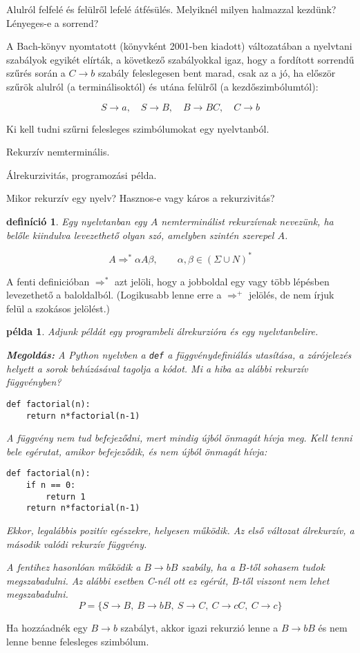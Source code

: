 \documentclass[a4paper]{article}
\newtheorem{pelda}{példa}[section]
\newtheorem{definicio}{definíció}[section]
\begin{document}
Alulról felfelé és felülről lefelé átfésülés.
Melyiknél milyen halmazzal kezdünk? Lényeges-e a sorrend?

A Bach-könyv nyomtatott (könyvként 2001-ben kiadott) változatában a nyelvtani
szabályok egyikét elírták, a következő szabályokkal igaz, hogy a
fordított sorrendű szűrés során a $C\to b$ szabály feleslegesen
bent marad, csak az a jó, ha először szűrök alulról (a terminálisoktól)
és utána felülről (a kezdőszimbólumtól):

\[S\to a,\quad S\to B,\quad B\to BC,\quad C\to b\]

Ki kell tudni szűrni felesleges szimbólumokat egy nyelvtanból.

Rekurzív nemterminális.

Álrekurzivitás, programozási példa.

Mikor rekurzív egy nyelv? Hasznos-e vagy káros a rekurzivitás?

\vspace{2em}

\begin{definicio}
    Egy nyelvtanban egy $A$ nemterminálist rekurzívnak nevezünk, ha belőle
    kiindulva levezethető olyan szó, amelyben szintén szerepel $A$.

    \[A \Rightarrow^* \alpha A \beta,
    \qquad \alpha, \beta \in (\Sigma \cup N)^*\]
\end{definicio}

A fenti definicióban $\Rightarrow^*$ azt jelöli,
hogy a jobboldal egy vagy több lépésben levezethető a baloldalból.
(Logikusabb lenne erre a $\Rightarrow^+$ jelölés, de nem írjuk felül a
szokásos jelölést.)

\begin{pelda}
Adjunk példát egy programbeli álrekurzióra és egy nyelvtanbelire.

\textbf{Megoldás:}
A Python nyelvben a \verb|def| a függvénydefiniálás utasítása, a
zárójelezés helyett a sorok behúzásával tagolja a kódot. Mi a hiba
az alábbi rekurzív függvényben?

\begin{verbatim}
def factorial(n):
    return n*factorial(n-1)
\end{verbatim}

A függvény nem tud befejeződni, mert mindig újból önmagát hívja meg.
Kell tenni bele egérutat, amikor befejeződik, és nem újból önmagát
hívja:

\begin{verbatim}
def factorial(n):
    if n == 0:
        return 1
    return n*factorial(n-1)
\end{verbatim}

Ekkor, legalábbis pozitív egészekre, helyesen működik. Az első változat
álrekurzív, a második valódi rekurzív függvény.

A fentihez hasonlóan működik a $B\to bB$ szabály, ha a $B$-től sohasem
tudok megszabadulni. Az alábbi esetben C-nél ott ez egérút, B-től
viszont nem lehet megszabadulni.
\[P=\{ S \to B,\: B\to bB ,\: S\to C,\: C\to cC,\: C\to c\}\]
\end{pelda}
\vspace{2em}
Ha hozzáadnék egy $B\to b$ szabályt, akkor igazi rekurzió lenne a $B\to
bB$ és nem lenne benne felesleges szimbólum.
\end{document}
